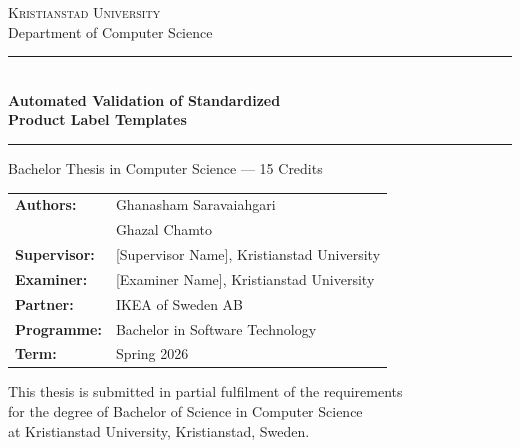 \begin{titlepage}
\centering

\vspace*{1.5cm}

{\Large \textsc{Kristianstad University}}\\[0.3cm]
{\normalsize Department of Computer Science}

\vspace{1.5cm}

\rule{\linewidth}{1.2pt}\\[0.5cm]
{\huge\bfseries Automated Validation of Standardized\\[0.4cm]
Product Label Templates}\\[0.4cm]
\rule{\linewidth}{1.2pt}

\vspace{1.5cm}

{\Large Bachelor Thesis in Computer Science — 15 Credits}

\vspace{1.5cm}

\begin{tabular}{ll}
\textbf{Authors:}     & Ghanasham Saravaiahgari \\[0.3cm]
                      & Ghazal Chamto \\[0.6cm]
\textbf{Supervisor:}  & [Supervisor Name], Kristianstad University \\[0.3cm]
\textbf{Examiner:}    & [Examiner Name], Kristianstad University \\[0.3cm]
\textbf{Partner:}     & IKEA of Sweden AB \\[0.3cm]
\textbf{Programme:}   & Bachelor in Software Technology \\[0.3cm]
\textbf{Term:}        & Spring 2026 \\
\end{tabular}

\vfill

{\small
This thesis is submitted in partial fulfilment of the requirements\\
for the degree of Bachelor of Science in Computer Science\\
at Kristianstad University, Kristianstad, Sweden.
}

\vspace{1cm}

\end{titlepage}
\clearpage
